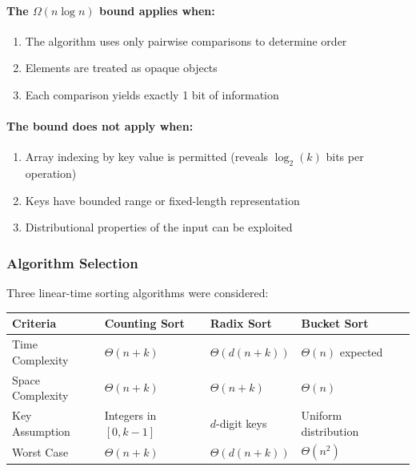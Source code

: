 \documentclass[12pt]{article}
\begin{document}
\paragraph{The $\Omega(n \log n)$ bound applies when:}
\begin{enumerate}
    \item The algorithm uses only pairwise comparisons to determine order
    \item Elements are treated as opaque objects
    \item Each comparison yields exactly 1 bit of information
\end{enumerate}

\paragraph{The bound does not apply when:}
\begin{enumerate}
    \item Array indexing by key value is permitted (reveals $\log_2(k)$ bits per operation)
    \item Keys have bounded range or fixed-length representation
    \item Distributional properties of the input can be exploited 
\end{enumerate}

\subsubsection{Algorithm Selection}

Three linear-time sorting algorithms were considered:

\begin{table}[h]
\centering
\begin{tabularx}{\linewidth}{@{}lXXXX@{}}
\toprule
\textbf{Criteria} & \textbf{Counting Sort} & \textbf{Radix Sort} & \textbf{Bucket Sort} \\
\midrule
Time Complexity  & $\Theta(n + k)$ & $\Theta(d(n + k))$ & $\Theta(n)$ expected \\
Space Complexity & $\Theta(n + k)$ & $\Theta(n + k)$ & $\Theta(n)$ \\
Key Assumption   & Integers in $[0, k-1]$ & $d$-digit keys & Uniform distribution \\
Worst Case       & $\Theta(n + k)$ & $\Theta(d(n + k))$ & $\Theta(n^2)$ \\
\bottomrule
\end{tabularx}
\end{table}
\end{document}
